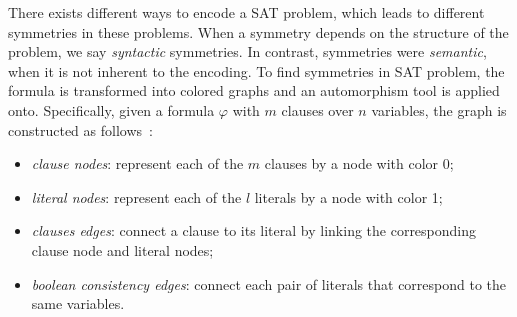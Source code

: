 There exists different ways to encode a SAT problem,
which leads to different symmetries in these problems.
When a symmetry depends on the structure of the problem, we say \emph{syntactic} symmetries. 
In contrast, symmetries were \emph{semantic}, when it is not inherent to the encoding.
To find symmetries in SAT problem, the formula is transformed into colored graphs
and an automorphism tool is applied onto. Specifically, given a formula $\varphi$ with
$m$ clauses over $n$ variables, the graph is constructed as follows~\cite{biere2009handbook}:
\begin{itemize}
 \item \emph{clause nodes}: represent each of the $m$ clauses by a node with color 0;
 \item \emph{literal nodes}: represent each of the $l$ literals by a node with color 1;
 \item \emph{clauses edges}: connect a clause to its literal by linking the corresponding  clause node and literal nodes;
 \item \emph{boolean consistency edges}: connect each pair of literals that correspond to the same variables.
\end{itemize}

